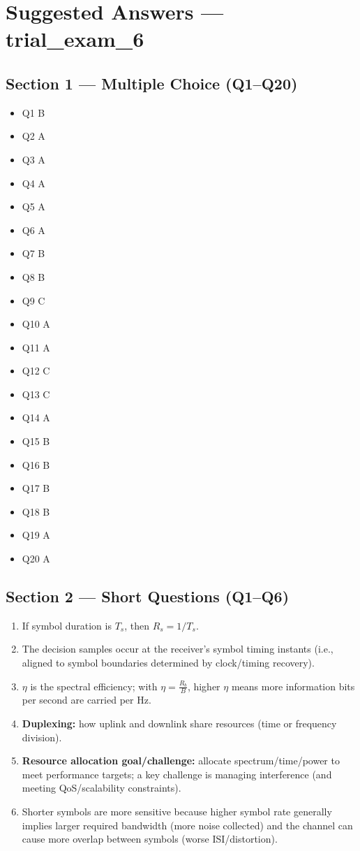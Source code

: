 \documentclass[11pt,a4paper]{article}
\begin{document}
\section*{Suggested Answers --- trial\_exam\_6}

\subsection*{Section 1 --- Multiple Choice (Q1--Q20)}
\begin{itemize}
    \item Q1 B
    \item Q2 A
    \item Q3 A
    \item Q4 A
    \item Q5 A
    \item Q6 A
    \item Q7 B
    \item Q8 B
    \item Q9 C
    \item Q10 A
    \item Q11 A
    \item Q12 C
    \item Q13 C
    \item Q14 A
    \item Q15 B
    \item Q16 B
    \item Q17 B
    \item Q18 B
    \item Q19 A
    \item Q20 A
\end{itemize}

\subsection*{Section 2 --- Short Questions (Q1--Q6)}
\begin{enumerate}[label=\arabic*.]
    \item If symbol duration is $T_s$, then $R_s = 1/T_s$.
    \item The decision samples occur at the receiver's symbol timing instants (i.e., aligned to symbol boundaries determined by clock/timing recovery).
    \item $\eta$ is the spectral efficiency; with $\eta=\frac{R_b}{B}$, higher $\eta$ means more information bits per second are carried per Hz.
    \item \textbf{Duplexing:} how uplink and downlink share resources (time or frequency division).
    \item \textbf{Resource allocation goal/challenge:} allocate spectrum/time/power to meet performance targets; a key challenge is managing interference (and meeting QoS/scalability constraints).
    \item Shorter symbols are more sensitive because higher symbol rate generally implies larger required bandwidth (more noise collected) and the channel can cause more overlap between symbols (worse ISI/distortion).
\end{enumerate}
\end{document}
